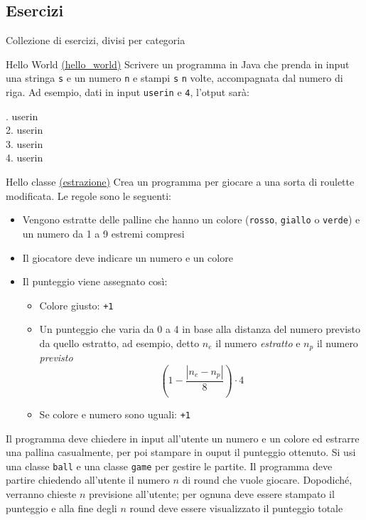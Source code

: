 \subsection{Esercizi}
Collezione di esercizi, divisi per categoria
\begin{esercizio}{Hello World \href{run:./files/java/esercizi/hello_world/}{(hello\_world)}}
	Scrivere un programma in Java che prenda in input una stringa \verb|s| e un numero \verb|n| e stampi \verb|s| \verb|n| volte, accompagnata dal numero di riga. Ad esempio, dati in input \verb|userin| e \verb|4|, l'otput sarà:
	\begin{center}
		. userin\\
		2. userin\\
		3. userin\\
		4. userin
	\end{center}
\end{esercizio}
\begin{esercizio}{Hello classe \href{run:./files/java/esercizi/estrazione/}{(estrazione)}}
	Crea un programma per giocare a una sorta di roulette modificata. Le regole sono le seguenti:
	\begin{itemize}
		\item Vengono estratte delle palline che hanno un colore (\verb|rosso|,  \verb|giallo| o \verb|verde|) e un numero da 1 a 9 estremi compresi
		\item Il giocatore deve indicare un numero e un colore
		\item Il punteggio viene assegnato così:
		      \begin{itemize}
			      \item Colore giusto: \verb|+1|
			      \item Un punteggio che varia da 0 a 4 in base alla distanza del numero previsto da quello estratto, ad esempio, detto $ n_e $ il numero \textit{estratto} e  $ n_p $ il numero \textit{previsto}
			            \[
				            \left(1 - \frac{\left|n_e - n_p\right|}{8}\right) \cdot 4
			            \]
			      \item Se colore e numero sono uguali: \verb|+1|
		      \end{itemize}
	\end{itemize}
	Il programma deve chiedere in input all'utente un numero e un colore ed estrarre una pallina casualmente, per poi stampare in ouput il punteggio ottenuto. Si usi una classe \verb|ball| e una classe \verb|game| per gestire le partite.
	\vskip3mm
	Il programma deve partire chiedendo all'utente il numero $ n $ di round che vuole giocare. Dopodiché, verranno chieste $ n $ previsione all'utente; per ognuna deve essere stampato il punteggio e alla fine degli $ n $ round deve essere visualizzato il punteggio totale
\end{esercizio}





